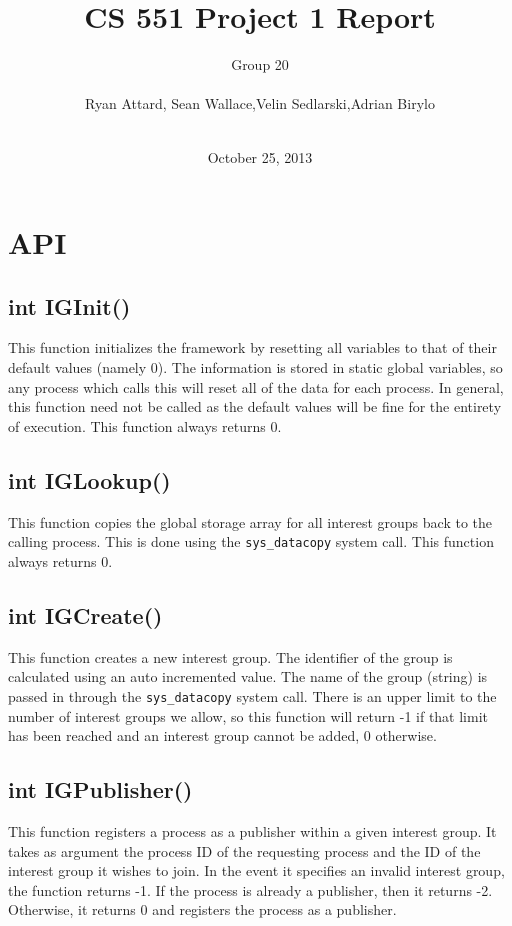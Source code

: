 \documentclass{article}
\title{CS 551 Project 1 Report}
\author{Group 20 \\\\ Ryan Attard, Sean Wallace,Velin Sedlarski,Adrian Birylo\\\\}
\date{October 25, 2013}
\begin{document}
\maketitle
\pagebreak 
\section{API}

\subsection{int IGInit()}
This function initializes the framework by resetting all variables to that of their default values (namely 0).  The information is stored in static global variables, so any process which calls this will reset all of the data for each process.  In general, this function need not be called as the default values will be fine for the entirety of execution.  This function always returns 0.

\subsection{int IGLookup()}
This function copies the global storage array for all interest groups back to the calling process.  This is done using the \verb+sys_datacopy+ system call.  This function always returns 0.

\subsection{int IGCreate()}
This function creates a new interest group.  The identifier of the group is calculated using an auto incremented value.  The name of the group (string) is passed in through the \verb+sys_datacopy+ system call.  There is an upper limit to the number of interest groups we allow, so this function will return -1 if that limit has been reached and an interest group cannot be added, 0 otherwise.

\subsection{int IGPublisher()}
This function registers a process as a publisher within a given interest group.  It takes as argument the process ID of the requesting process and the ID of the interest group it wishes to join.  In the event it specifies an invalid interest group, the function returns -1.  If the process is already a publisher, then it returns -2.  Otherwise, it returns 0 and registers the process as a publisher.
\end{document}
